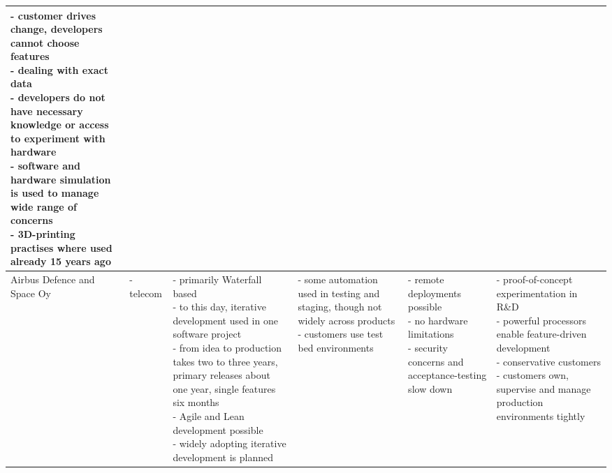 \documentclass[english]{tktltiki2}
\begin{document}
\begin{landscape}
\begin{longtable}{|p{2.5cm}|p{1.5cm}|p{4cm}|p{4cm}|p{4cm}|p{4cm}|}
{                        - customer drives change, developers cannot choose features \\
                        - dealing with exact data \\
                        - developers do not have necessary knowledge or access to experiment with hardware \\
                        - software and hardware simulation is used to manage wide range of concerns \\
                        - 3D-printing practises where used already 15 years ago} \\

        \hline

        Airbus Defence and Space Oy &
        - telecom &
        \parbox[t]{4cm}{- primarily Waterfall based \\
                        - to this day, iterative development used in one software project \\
                        - from idea to production takes two to three years, primary releases about one year, single features six months \\
                        - Agile and Lean development possible \\
                        - widely adopting iterative development is planned} &
        \parbox[t]{4cm}{- some automation used in testing and staging, though not widely across products \\
                        - customers use test bed environments} &
        \parbox[t]{4cm}{- remote deployments possible \\
                        - no hardware limitations \\
                        - security concerns and acceptance-testing slow down} &
        \parbox[t]{4cm}{- proof-of-concept experimentation in R\&D \\
                        - powerful processors enable feature-driven development \\
                        - conservative customers \\
                        - customers own, supervise and manage production environments tightly} \\

        \hline


\end{longtable}
\end{landscape}
\end{document}

